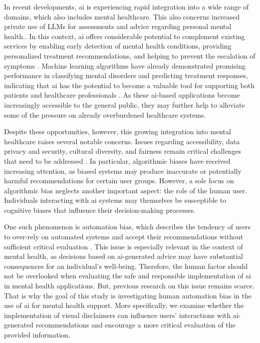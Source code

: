 \documentclass[sigconf,natbib=false]{acmart}
\begin{document}
In recent developments, \Gls{ai} is experiencing rapid integration into a wide range of domains, which also includes mental healthcare.
This also concerns increased private use of LLMs for assessments and advice regarding personal mental health.\autocite[]{jung_ive_2025}.
In this context, \Gls{ai} offers considerable potential to complement existing services by enabling early detection of mental health conditions, providing personalized treatment recommendations, and helping to prevent the escalation of symptoms \autocite[]{mikaeili_reimagining_2025}. Machine learning algorithms have already demonstrated promising performance in classifying mental disorders and predicting treatment responses, indicating that \Gls{ai} has the potential to become a valuable tool for supporting both patients and healthcare professionals \autocite[]{gonzalez_systematic_review}. As these \Gls{ai}-based applications become increasingly accessible to the general public, they may further help to alleviate some of the pressure on already overburdened healthcare systems.

Despite these opportunities, however, this growing integration into mental healthcare raises several notable concerns. Issues regarding accessibility, data privacy and security, cultural diversity, and fairness remain critical challenges that need to be addressed \autocite[]{ali_artificial_2025}. In particular, algorithmic biases have received increasing attention, as biased systems may produce inaccurate or potentially harmful recommendations for certain user groups. However, a sole focus on algorithmic bias neglects another important aspect: the role of the human user. Individuals interacting with \Gls{ai} systems may themselves be susceptible to cognitive biases that influence their decision-making processes.

One such phenomenon is automation bias, which describes the tendency of users to over-rely on automated systems and accept their recommendations without sufficient critical evaluation \autocite[p.~391]{parasuraman_complacency_2010}. This issue is especially relevant in the context of mental health, as decisions based on \Gls{ai}-generated advice may have substantial consequences for an individual’s well-being. 
Therefore, the human factor should not be overlooked when evaluating the safe and responsible implementation of \Gls{ai} in mental health applications. But, previous research on this issue remains scarce. That is why the goal of this study is investigating human automation bias in the use of \Gls{ai} for mental health support. More specifically, we examine whether the implementation of visual disclaimers can influence users’ interactions with \Gls{ai}-generated recommendations and encourage a more critical evaluation of the provided information.
\end{document}
